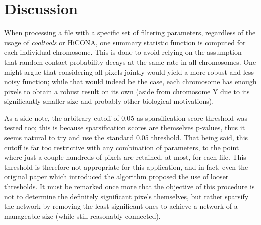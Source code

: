 \graphicspath{{chapters/06_discussion/}}
\chapter{Discussion}










When processing a file with a specific set of filtering parameters, regardless of the usage of \textit{cooltools} or HiCONA, one summary statistic function is computed for each individual chromosome. This is done to avoid relying on the assumption that random contact probability decays at the same rate in all chromosomes. One might argue that considering all pixels jointly would yield a more robust and less noisy function; while that would indeed be the case, each chromosome has enough pixels to obtain a robust result on its own (aside from chromosome Y due to its significantly smaller size and probably other biological motivations).

As a side note, the arbitrary cutoff of 0.05 as sparsification score threshold was tested too; this is because sparsification scores are themselves p-values, thus it seems natural to try and use the standard 0.05 threshold. That being said, this cutoff is far too restrictive with any combination of parameters, to the point where just a couple hundreds of pixels are retained, at most, for each file. This threshold is therefore not appropriate for this application, and in fact, even the original paper which introduced the algorithm proposed the use of looser thresholds. It must be remarked once more that the objective of this procedure is not to determine the definitely significant pixels themselves, but rather sparsify the network by removing the least significant ones to achieve a network of a manageable size (while still reasonably connected). 

